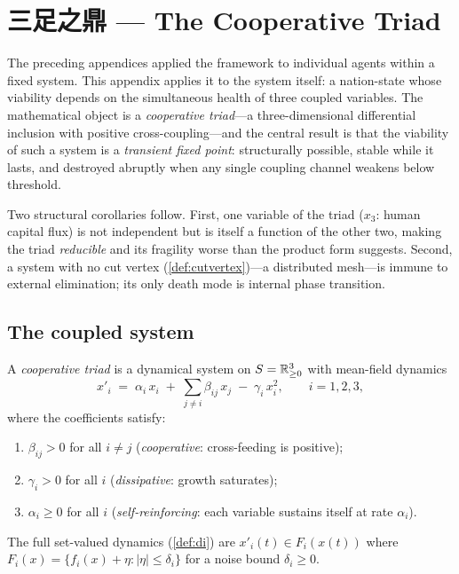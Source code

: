 \chapter{三足之鼎 --- The Cooperative Triad}\label{app:triad}

The preceding appendices applied the framework to individual agents
within a fixed system.  This appendix applies it to the system
itself: a nation-state whose viability depends on the simultaneous
health of three coupled variables.  The mathematical object is a
\emph{cooperative triad}---a three-dimensional differential
inclusion with positive cross-coupling---and the central result
is that the viability of such a system is a \emph{transient fixed
point}: structurally possible, stable while it lasts, and destroyed
abruptly when any single coupling channel weakens below threshold.

Two structural corollaries follow.  First, one variable of the
triad ($x_3$: human capital flux) is not independent but is itself
a function of the other two, making the triad \emph{reducible} and
its fragility worse than the product form suggests.  Second, a
system with no cut vertex (\cref{def:cutvertex})---a distributed
mesh---is immune to external elimination; its only death mode is
internal phase transition.

\section{The coupled system}\label{sec:triad-system}

\begin{definition}\label{def:triad}
A \emph{cooperative triad} is a dynamical system on
$S = \mathbb{R}^3_{\geq 0}$ with mean-field dynamics
\begin{equation}\label{eq:triad}
  x'_i \;=\; \alpha_i\, x_i
  \;+\; \sum_{j \neq i} \beta_{ij}\, x_j
  \;-\; \gamma_i\, x_i^2,
  \qquad i = 1, 2, 3,
\end{equation}
where the coefficients satisfy:
\begin{enumerate}[label=(\roman*)]
  \item $\beta_{ij} > 0$ for all $i \neq j$
    \quad (\emph{cooperative}: cross-feeding is positive);
  \item $\gamma_i > 0$ for all $i$
    \quad (\emph{dissipative}: growth saturates);
  \item $\alpha_i \geq 0$ for all $i$
    \quad (\emph{self-reinforcing}: each variable sustains itself
    at rate $\alpha_i$).
\end{enumerate}
The full set-valued dynamics (\cref{def:di}) are
$x'_i(t) \in F_i(x(t))$ where
$F_i(x) = \{f_i(x) + \eta : |\eta| \leq \delta_i\}$ for a
noise bound $\delta_i \geq 0$.
\end{definition}

